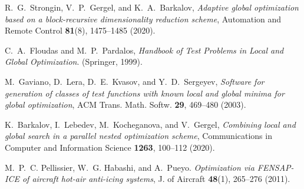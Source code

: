 \documentclass[
11pt,%
tightenlines,%
twoside,%
onecolumn,%
nofloats,%
nobibnotes,%
nofootinbib,%
superscriptaddress,%
noshowpacs,%
centertags]%
{revtex4}
\begin{document}
\begin{thebibliography}{99}
R.~G.~Strongin, V.~P.~Gergel, and K.~A.~Barkalov, \textit{Adaptive
global optimization based on a block-recursive dimensionality
reduction scheme}, Automation and Remote Control \textbf{81}(8),
1475--1485 (2020).

C.~A.~Floudas and M.~P.~Pardalos,  \textit{Handbook of Test Problems in Local and Global Optimization}. (Springer, 1999).  %

M.~Gaviano, D.~Lera, D.~E.~Kvasov, and Y.~D.~Sergeyev,
\textit{Software for generation of classes of test functions with
known local and global minima for global optimization}, ACM Trans.
Math. Softw. \textbf{29}, 469--480 (2003).

K.~Barkalov, I.~Lebedev, M.~Kocheganova, and V.~Gergel,
\textit{Combining local and global search in a parallel nested
optimization scheme}, Communications in Computer and Information
Science \textbf{1263}, 100--112 (2020).

M.~P.~C. Pellissier, W.~G. Habashi, and A.~Pueyo.
\textit{Optimization via FENSAP-ICE of aircraft hot-air anti-icing
systems}, J. of Aircraft \textbf{48}(1), 265--276 (2011).


\end{thebibliography}
\end{document}
